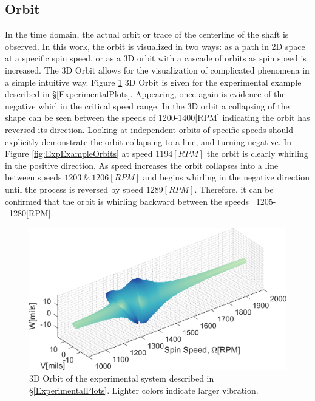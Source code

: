 \subsection{Orbit}
In the time domain, the actual orbit or trace of the centerline of the shaft is observed. In this work, the orbit is visualized in two ways: as a path in 2D space at a specific spin speed, or as a 3D orbit with a cascade of orbits as spin speed is increased. The 3D Orbit allows for the visualization of complicated phenomena in a simple intuitive way. Figure \ref{fig:ExpExample3DOrbit} 3D Orbit is given for the experimental example described in \S\ref{ExperimentalPlots}. Appearing, once again is evidence of the negative whirl in the critical speed range. In the 3D orbit a collapsing of the shape can be seen between the speeds of 1200-1400[RPM] indicating the orbit has reversed its direction. Looking at independent orbits of specific speeds should explicitly demonstrate the orbit collapsing to a line, and turning negative. In Figure \ref{fig:ExpExampleOrbits} at speed $ 1194[RPM] $ the orbit is clearly whirling in the positive direction. As speed increases the orbit collapses into a line between speeds $ 1203\ \&\ 1206[RPM] $ and begins whirling in the negative direction until the process is reversed by speed $ 1289[RPM] $. Therefore, it can be confirmed that the orbit is whirling backward between the speeds ~1205-~1280[RPM].\par
\begin{figure}
	\centering

	\includegraphics[width=\linewidth]{./figures/ExpExampleOrbit3D.png}
	\caption{3D Orbit of the experimental system described in \S\ref{ExperimentalPlots}. Lighter colors indicate larger vibration.}
	\label{fig:ExpExample3DOrbit}
\end{figure}
